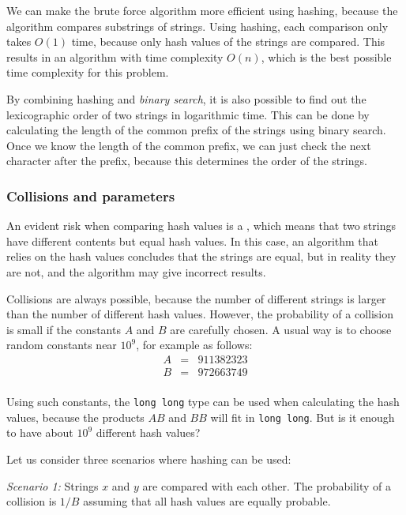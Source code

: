 We can make the brute force algorithm more efficient
using hashing, because the algorithm compares
substrings of strings.
Using hashing, each comparison only takes $O(1)$ time,
because only hash values of the strings are compared.
This results in an algorithm with time complexity $O(n)$,
which is the best possible time complexity for this problem.

By combining hashing and \emph{binary search},
it is also possible to find out the lexicographic order of
two strings in logarithmic time.
This can be done by calculating the length
of the common prefix of the strings using binary search.
Once we know the length of the common prefix,
we can just check the next character after the prefix,
because this determines the order of the strings.

\subsubsection*{Collisions and parameters}


An evident risk when comparing hash values is
a , which means that two strings have
different contents but equal hash values.
In this case, an algorithm that relies on
the hash values concludes that the strings are equal,
but in reality they are not,
and the algorithm may give incorrect results.

Collisions are always possible,
because the number of different strings is larger
than the number of different hash values.
However, the probability of a collision is small
if the constants $A$ and $B$ are carefully chosen.
A usual way is to choose random constants
near $10^9$, for example as follows:
\[
\begin{array}{lcl}
A & = & 911382323 \\
B & = & 972663749 \\
\end{array}
\]

Using such constants,
the \texttt{long long} type can be used
when calculating the hash values,
because the products $AB$ and $BB$ will fit in \texttt{long long}.
But is it enough to have about $10^9$ different hash values?

Let us consider three scenarios where hashing can be used:

\textit{Scenario 1:} Strings $x$ and $y$ are compared with
each other.
The probability of a collision is $1/B$ assuming that
all hash values are equally probable.

